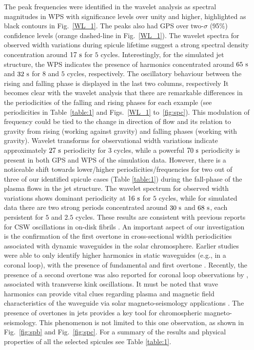 The peak frequencies were identified in the wavelet analysis as spectral magnitudes in WPS with significance levels over unity and higher, highlighted as black contours in Fig.~\ref{WL_1}. The peaks also had GPS over two-$\sigma$ (95\%) confidence levels (orange dashed-line in Fig.~\ref{WL_1}). The wavelet spectra for observed width variations during spicule lifetime suggest a strong spectral density concentration around $17~\rm{s}$ for $5$ cycles. Interestingly, for the simulated jet structure, the WPS indicates the presence of harmonics concentrated around $65~\rm{s}$ and $32~\rm{s}$ for $8$ and $5$ cycles, respectively. The oscillatory behaviour between the rising and falling phase is displayed in the last two columns, respectively It becomes clear with the wavelet analysis that there are remarkable differences in the periodicities of the falling and rising phases for each example (see periodicities in Table~\ref{table:1} and Figs.~\ref{WL_1} to~\ref{fig:spc}). This modulation of frequency could be tied to the change in direction of flow and its relation to gravity from rising (working against gravity) and falling phases (working with gravity). Wavelet transforms for observational width variations indicate approximately $27~\rm{s}$ periodicity for 3 cycles, while a powerful $70~\rm{s}$ periodicity is present in both GPS and WPS of the simulation data. However, there is a noticeable shift towards lower/higher periodicities/frequencies for two out of three of our identified spicule cases (Table \ref{table:1}) during the fall-phase of the plasma flows in the jet structure. The wavelet spectrum for observed width variations shows dominant periodicity at $16~\rm{s}$ for $5$ cycles, while for simulated data there are two strong periods concentrated around $30~\rm{s}$ and $68~\rm{s}$, each persistent for $5$ and $2.5$ cycles. These results are consistent with previous reports for CSW oscillations in on-disk fibrils \citep{Gafeira2017ApJS2297G}. \np
%
An important aspect of our investigation is the confirmation of the first overtone in cross-sectional width periodicities associated with dynamic waveguides in the solar chromosphere.  Earlier studies were able to only identify higher harmonics in static waveguides (e.g., in a coronal loop), with the presence of fundamental and first overtone \citep{verwichte2004, guo2015}. Recently, the presence of a second overtone was also reported for coronal loop observations by \citet{duckenfield2019}, associated with transverse kink oscillations. It must be noted that wave harmonics can provide vital clues regarding plasma and magnetic field characteristics of the waveguide via solar magneto-seismology applications \citep{andries2005,andries2009}. The presence of overtones in jets provides a key tool for chromospheric magneto-seismology. This phenomenon is not limited to this one observation, as shown in Fig.~\ref{fig:spb} and Fig.~\ref{fig:spc}. For a summary of the results and physical properties of all the selected spicules see Table \ref{table:1}. \np 
